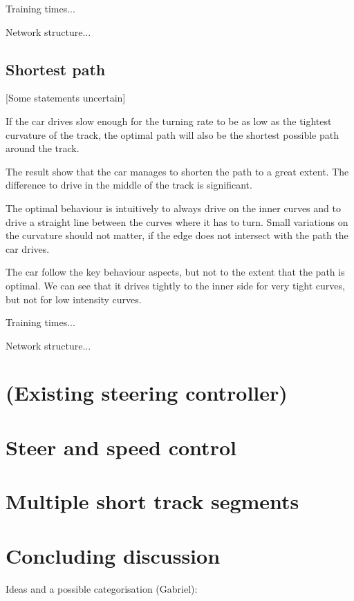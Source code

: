 Training times...

Network structure... 


\subsection{Shortest path}

[Some statements uncertain]

If the car drives slow enough for the turning rate to be as low as the tightest curvature of the track, the optimal path will also be the shortest possible path around the track.

The result show that the car manages to shorten the path to a great extent. The difference to drive in the middle of the track is significant.

The optimal behaviour is intuitively to always drive on the inner curves and to drive a straight line between the curves where it has to turn. Small variations on the curvature should not matter, if the edge does not intersect with the path the car drives.

The car follow the key behaviour aspects, but not to the extent that the path is optimal. We can see that it drives tightly to the inner side for very tight curves, but not for low intensity curves.

Training times...

Network structure...


\section{(Existing steering controller)}

\section{Steer and speed control}

\section{Multiple short track segments}

\section{Concluding discussion}
%
Ideas and a possible categorisation (Gabriel):

